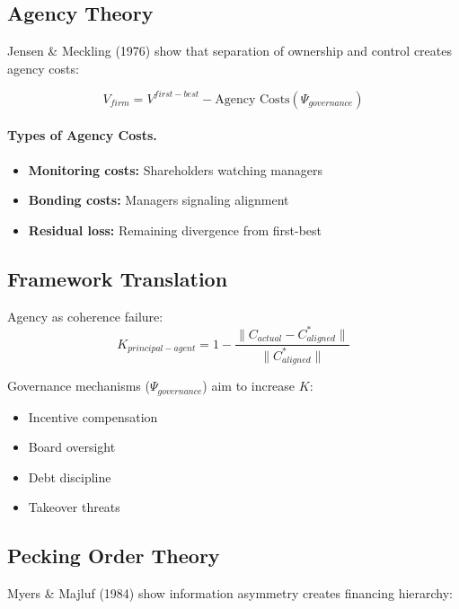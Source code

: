 \subsection{Agency Theory}

Jensen \& Meckling (1976) show that separation of ownership and control
creates agency costs:

\begin{equation}
\boxed{
V_{firm} = V^{first-best} - \text{Agency Costs}(\Psi_{governance})
}
\label{eq:agency}
\end{equation}

\paragraph{Types of Agency Costs.}
\begin{itemize}
    \item \textbf{Monitoring costs:} Shareholders watching managers
    \item \textbf{Bonding costs:} Managers signaling alignment
    \item \textbf{Residual loss:} Remaining divergence from first-best
\end{itemize}

\subsection{Framework Translation}

Agency as coherence failure:
\begin{equation}
K_{principal-agent} = 1 - \frac{\|C_{actual} - C^*_{aligned}\|}{\|C^*_{aligned}\|}
\end{equation}

Governance mechanisms ($\Psi_{governance}$) aim to increase $K$:
\begin{itemize}
    \item Incentive compensation
    \item Board oversight
    \item Debt discipline
    \item Takeover threats
\end{itemize}

\subsection{Pecking Order Theory}

Myers \& Majluf (1984) show information asymmetry creates financing hierarchy:

